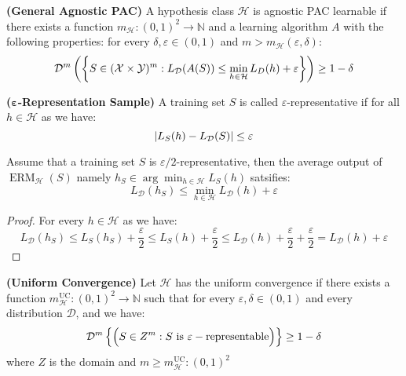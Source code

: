 \begin{definition}{\textbf{(General Agnostic PAC)}}
    A hypothesis class $\mathcal{H}$ is agnostic PAC learnable if there exists a function $m_\mathcal{H}:(0, 1)^2\rightarrow \mathbb{N}$ and a learning algorithm $A$ with the following properties: for every $\delta, \varepsilon \in (0, 1)$ and $m>m_\mathcal{H}(\varepsilon,\delta)$:
    \begin{equation*}
        \mathcal{D}^m\left( \left\{ S \in (\mathcal{X}\times\mathcal{Y})^m : L_\mathcal{D}(A(S)) \le \min_{h\in\mathcal{H}}L_D(h) + \varepsilon  \right\} \right)\ge1-\delta
    \end{equation*}
\end{definition}

\begin{definition}{\textbf{($\boldsymbol \varepsilon$-Representation Sample)}}
    A training set $S$ is called $\varepsilon$-representative if for all $h \in \mathcal{H}$  as we have:
    \begin{equation*}
        \left| L_S(h) - L_\mathcal{D}(S) \right| \le \varepsilon
    \end{equation*}
\end{definition}

\begin{lemma}
    Assume that a training set $S$ is $\varepsilon/2$-representative, then the average output of $\operatorname{ERM}_\mathcal{H}(S)$  namely $h_S \in \arg\min_{h\in\mathcal{H}}L_S(h)$ satsifies:
    \begin{equation*}
        L_\mathcal{D}(h_S) \le \min_{h\in\mathcal{H}}L_\mathcal{D}(h) + \varepsilon
    \end{equation*}
\end{lemma}
\begin{proof}
    For every $h\in\mathcal{H}$ as we have:
    \begin{equation*}
        L_\mathcal{D}(h_S) \le L_S(h_S) + \frac{\varepsilon}{2} \le L_S(h) + \frac{\varepsilon}{2} \le L_\mathcal{D}(h) + \frac{\varepsilon}{2} + \frac{\varepsilon}{2} =  L_\mathcal{D}(h)+\varepsilon
    \end{equation*}
\end{proof}

\begin{definition}{\textbf{(Uniform Convergence)}}
    Let $\mathcal{H}$ has the uniform convergence if there exists a function $m^\text{UC}_\mathcal{H} : (0, 1)^2 \rightarrow \mathbb{N}$ such that for every $\varepsilon, \delta\in(0, 1)$ and every distribution $\mathcal{D}$, and we have:
    \begin{equation*}
        \mathcal{D}^m\left\{ \Big( S \in Z^m : S \text{ is } \varepsilon-\text{representable}  \Big) \right\} \ge1-\delta
    \end{equation*}
    where $Z$ is the domain and $m \ge m^\text{UC}_\mathcal{H} : (0, 1)^2$
\end{definition}


